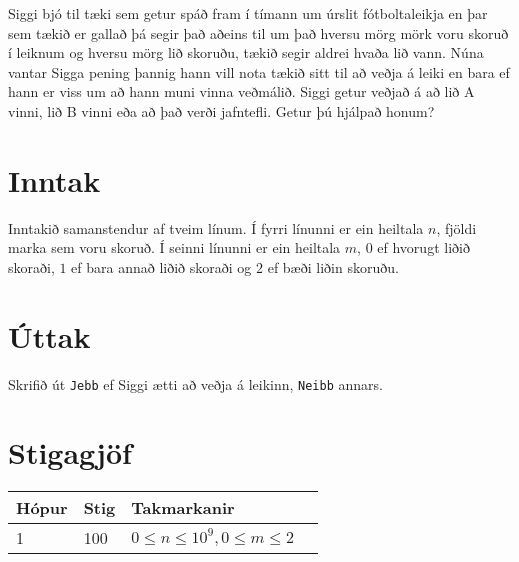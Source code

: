 Siggi bjó til tæki sem getur spáð fram í tímann um úrslit fótboltaleikja en þar sem tækið er gallað þá
segir það aðeins til um það hversu mörg mörk voru skoruð í leiknum og hversu mörg lið skoruðu, tækið segir aldrei hvaða lið vann.
Núna vantar Sigga pening þannig hann vill nota tækið sitt til að veðja á leiki en bara ef hann er viss um
að hann muni vinna veðmálið. Siggi getur veðjað á að lið A vinni, lið B vinni eða
að það verði jafntefli.
Getur þú hjálpað honum?

\section*{Inntak}
Inntakið samanstendur af tveim línum.
Í fyrri línunni er ein heiltala $n$, fjöldi marka sem voru skoruð.
Í seinni línunni er ein heiltala $m$, $0$ ef hvorugt liðið skoraði, $1$ ef bara annað liðið skoraði
og $2$ ef bæði liðin skoruðu.

\section*{Úttak}
Skrifið út \texttt{Jebb} ef Siggi ætti að veðja á leikinn, \texttt{Neibb} annars.

\section*{Stigagjöf}
\begin{tabular}{|l|l|l|l|}
\hline
Hópur & Stig & Takmarkanir \\ \hline
1     & 100     & $0 \leq n \leq 10^9, 0 \leq m \leq 2$ \\ \hline
\end{tabular}
